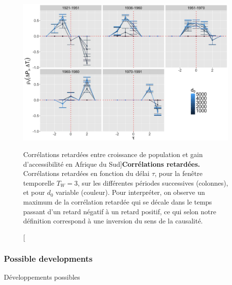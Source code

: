 \begin{figure}
\includegraphics[width=\linewidth]{Figures/Final/4-2-3-fig-causalityregimes-sudafcorrs.jpg}
\caption[Lagged correlations in South Africa][Corrélations retardées entre croissance de population et gain d'accessibilité en Afrique du Sud]{\label{fig:causalityregimes:sudafcorrs}}{\textbf{Corrélations retardées.}  Corrélations retardées en fonction du délai $\tau$, pour la fenêtre temporelle $T_W=3$, sur les différentes périodes successives (colonnes), et pour $d_0$ variable (couleur). Pour interpréter, on observe un maximum de la corrélation retardée qui se décale dans le temps passant d'un retard négatif à un retard positif, ce qui selon notre définition correspond à une inversion du sens de la causalité.\label{fig:causalityregimes:sudafcorrs}}
\end{figure}



\subsubsection{Possible developments}{Développements possibles}

